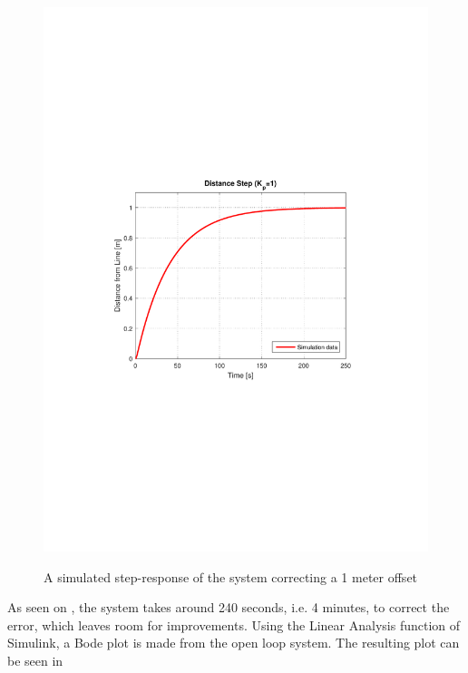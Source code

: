 \begin{figure}[H]
  \centering
  {
    \includegraphics[width=1.4\textwidth]{figures/distanceStep1.pdf}
  }
  \caption{A simulated step-response of the system correcting a 1 meter offset}
  \label{SimulationSteeringP1}
\end{figure}\vspace{-5mm}
As seen on , the system takes around 240 seconds, i.e. 4 minutes, to correct the error, which leaves room for improvements.
\newpage
Using the Linear Analysis function of Simulink, a Bode plot is made from the open loop system. The resulting plot can be seen in 
